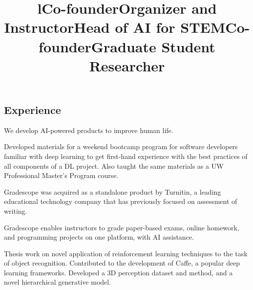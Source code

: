 \documentclass[line, margin]{res}
\title{l}\\
\begin{document}
\newsectionwidth{1in}

\address{\small{\textcolor{MidnightBlue}{https://sergeykarayev.com} $\cdot$ \textcolor{MidnightBlue}{sergeykarayev@gmail.com} $\cdot$ Updated 2021 September 30}}

\begin{resume}

\section{\sc Experience}

\title{\bf Co-founder}
\begin{position}
We develop AI-powered products to improve human life.
\end{position}

\title{\bf Organizer and Instructor}
\begin{position}
Developed materials for a weekend bootcamp program for software developers familiar with deep learning to get first-hand experience with the best practices of all components of a DL project. Also taught the same materials as a UW Professional Master's Program course.
\end{position}

\title{\bf Head of AI for STEM}
\begin{position}
Gradescope was acquired as a standalone product by Turnitin, a leading educational technology company that has previously focused on assessment of writing.
\end{position}

\title{\bf Co-founder}
\begin{position}
Gradescope enables instructors to grade paper-based exams, online homework, and programming projects on one platform, with AI assistance.
\end{position}

\title{\bf Graduate Student Researcher}
\begin{position}
Thesis work on novel application of reinforcement learning techniques to the task of object recognition.
Contributed to the development of Caffe, a popular deep learning frameworks.
Developed a 3D perception dataset and method, and a novel hierarchical generative model.
\end{position}


\end{resume}
\end{document}
